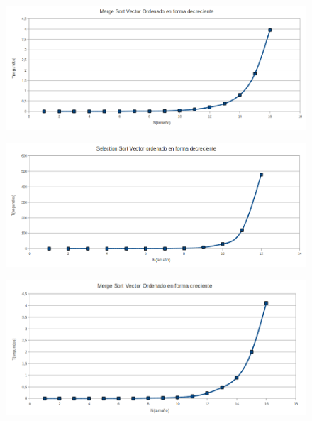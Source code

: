 \newpage

\begin{figure}[!htp]
\begin{center}
\includegraphics[width=12cm]{Imagenes/MergeSortOrdenadodecreciente.PNG}
\end{center}
\end{figure} 

\begin{figure}[!htp]
\begin{center}
\includegraphics[width=12cm]{Imagenes/SelectionSortOrdenadodecreciente.PNG}
\end{center}
\end{figure} 

\begin{figure}[!htp]
\begin{center}
\includegraphics[width=12cm]{Imagenes/MergeSortOrdenadocreciente.PNG}
\end{center}
\end{figure} 


